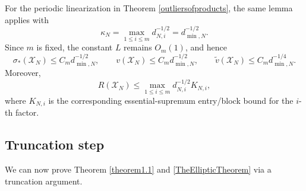 \documentclass[11pt,reqno]{amsart}
\theoremstyle{plain}
\theoremstyle{remark}
\numberwithin{equation}{section}
\begin{document}
For the periodic linearization in Theorem \ref{outliersofproducts}, the same lemma applies with
\[
\kappa_N=\max_{1\le i\le m}d_{N,i}^{-1/2}=d_{\min,N}^{-1/2}.
\]
Since \(m\) is fixed, the constant \(L\) remains \(O_m(1)\), and hence
\begin{equation}
\sigma_*(\mathcal X_N)\le C_m d_{\min,N}^{-1/2},\qquad
v(\mathcal X_N)\le C_m d_{\min,N}^{-1/2},\qquad
\widetilde v(\mathcal X_N)\le C_m d_{\min,N}^{-1/4}.
\label{4.6}
\end{equation}
Moreover,
\begin{equation}
R(\mathcal X_N)
\le
\max_{1\le i\le m} d_{N,i}^{-1/2}K_{N,i},
\label{4.7}
\end{equation}
where \(K_{N,i}\) is the corresponding essential-supremum entry/block bound for the
\(i\)-th factor.

\subsection{Truncation step}

We can now prove Theorem \ref{theorem1.1} and \ref{TheEllipticTheorem} via a truncation argument.
\end{document}
